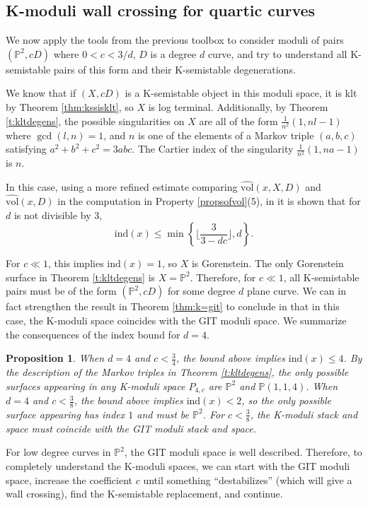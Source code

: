 \documentclass[11pt]{amsart}
\numberwithin{equation}{section}
\newtheorem{prop}[theorem]{Proposition}
\theoremstyle{definition}
\newcommand{\bP}{\mathbb{P}}
\newcommand{\vol}{\mathrm{vol}}
\newcommand{\ind}{\mathrm{ind}}
\begin{document}
\subsection{K-moduli wall crossing for quartic curves}

We now apply the tools from the previous toolbox to consider moduli of pairs $(\bP^2, cD)$ where $0 < c < 3/d$, $D$ is a degree $d$ curve, and try to understand all K-semistable pairs of this form and their K-semistable degenerations.  

We know that if $(X,cD)$ is a K-semistable object in this moduli space, it is klt by Theorem \ref{thm:kssisklt}, so $X$ is log terminal.  Additionally, by Theorem \ref{t:kltdegens}, the possible singularities on $X$ are all of the form $\frac{1}{n^2}(1,nl-1)$ where $\gcd(l,n) = 1$, and $n$ is one of the elements of a Markov triple $(a,b,c)$ satisfying $a^2 + b^2 + c^2 = 3abc$.  The Cartier index of the singularity $\frac{1}{n^2}(1,na-1)$ is $n$.

In this case, using a more refined estimate comparing $\widehat{\vol}(x,X,D)$ and $\widehat{\vol}(x,D)$ in the computation in Property \ref{propsofvol}(5), in \cite{ADLpub} it is shown that for $d$ is not divisible by 3, 
\[ \ind (x) \le \min \left\{ \lfloor \frac{3}{3-dc} \rfloor, d \right\} .\]  

For $c \ll 1$, this implies $\ind(x) = 1$, so $X$ is Gorenstein.  The only Gorenstein surface in Theorem \ref{t:kltdegens} is $X = \bP^2$.  Therefore, for $c \ll 1$, all K-semistable pairs must be of the form $(\bP^2, cD)$ for some degree $d$ plane curve.  We can in fact strengthen the result in Theorem \ref{thm:k=git} to conclude in that in this case, the K-moduli space coincides with the GIT moduli space.  We summarize the consequences of the index bound for $d = 4$.

\begin{prop}
        When $d = 4$ and $c < \frac{3}{4}$, the bound above implies $\ind (x) \le 4$.  By the description of the Markov triples in Theorem \ref{t:kltdegens}, the only possible surfaces appearing in any K-moduli space $P_{4,c}$ are $\bP^2$ and $\bP(1,1,4)$.  When $d = 4$ and $c < \frac{3}{8}$, the bound above implies $\ind(x) < 2$, so the only possible surface appearing has index $1$ and must be $\bP^2$.  For $c < \frac{3}{8}$, the K-moduli stack and space must coincide with the GIT moduli stack and space. 
\end{prop}


For low degree curves in $\bP^2$, the GIT moduli space is well described.  Therefore, to completely understand the K-moduli spaces, we can start with the GIT moduli space, increase the coefficient $c$ until something ``destabilizes'' (which will give a wall crossing), find the K-semistable replacement, and continue.  
\end{document}
